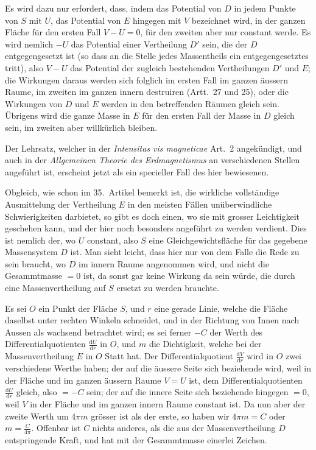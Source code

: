 Es wird dazu nur erfordert, dass, indem das Potential von $D$ in jedem Punkte von $S$ mit $U$, das Potential von $E$ hingegen mit $V$ bezeichnet wird, in der ganzen Fläche für den ersten Fall $V-U=0$, für den zweiten aber nur constant werde. Es wird nemlich $-U$ das Potential einer Vertheilung $D'$ sein, die der $D$ entgegengesetzt ist (so dass an die Stelle jedes Massentheils ein entgegengesetztes tritt), also $V-U$ das Potential der zugleich bestehenden Vertheilungen $D'$ und $E$; die Wirkungen daraus werden sich folglich im ersten Fall im ganzen äussern Raume, im zweiten im ganzen innern destruiren (Artt.\ 27 und 25), oder die Wirkungen von $D$ und $E$ werden in den betreffenden Räumen gleich sein. Übrigens wird die ganze Masse in $E$ für den ersten Fall der Masse in $D$ gleich sein, im zweiten aber willkürlich bleiben.

Der Lehrsatz, welcher in der \textit{Intensitas vis magneticae} Art.\ 2 angekündigt, und auch in der \textit{Allgemeinen Theorie des Erdmagnetismus} an verschiedenen Stellen angeführt ist, erscheint jetzt als ein specieller Fall des hier bewiesenen.

Obgleich, wie schon im 35.\ Artikel bemerkt ist, die wirkliche vollständige Ausmittelung der Vertheilung $E$ in den meisten Fällen unüberwindliche Schwierigkeiten darbietet, so gibt es doch einen, wo sie mit grosser Leichtigkeit geschehen kann, und der hier noch besonders angeführt zu werden verdient. Dies ist nemlich der, wo $U$ constant, also $S$ eine Gleichgewichtsfläche für das gegebene Massensystem $D$ ist. Man sieht leicht, dass hier nur von dem Falle die Rede zu sein braucht, wo $D$ im innern Raume angenommen wird, und nicht die Gesammtmasse $=0$ ist, da sonst gar keine Wirkung da sein würde, die durch eine Massenvertheilung auf $S$ ersetzt zu werden brauchte.

Es sei $O$ ein Punkt der Fläche $S$, und $r$ eine gerade Linie, welche die Fläche daselbst unter rechten Winkeln schneidet, und in der Richtung von Innen nach Aussen als wachsend betrachtet wird; es sei ferner $-C$ der Werth des Differentialquotienten $\frac{\mathrm dU}{\mathrm dr}$ in $O$, und $m$ die Dichtigkeit, welche bei der Massenvertheilung $E$ in $O$ Statt hat. Der Differentialquotient $\frac{\mathrm dV}{\mathrm dr}$ wird in $O$ zwei verschiedene Werthe haben; der auf die äussere Seite sich beziehende wird,
weil in der Fläche und im ganzen äussern Raume $V=U$ ist, dem Differentialquotienten $\frac{\mathrm dU}{\mathrm dr}$ gleich, also $=-C$ sein; der auf die innere Seite sich beziehende hingegen $=0$, weil $V$ in der Fläche und im ganzen innern Raume constant ist. Da nun aber der zweite Werth um $4\pi m$ grösser ist als der erste, so haben wir $4\pi m=C$ oder $m=\frac C{4\pi}$. Offenbar ist $C$ nichts anderes, als die aus der Massenvertheilung $D$ entspringende Kraft, und hat mit der Gesammtmasse einerlei Zeichen.

